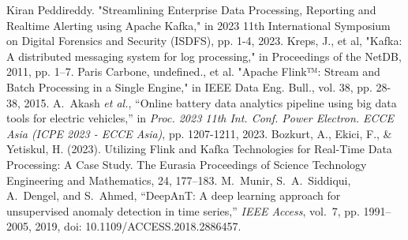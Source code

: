 \documentclass[runningheads]{llncs}
\begin{document}
\begin{thebibliography}{8}
 Kiran Peddireddy. "Streamlining Enterprise Data Processing, Reporting and Realtime Alerting using Apache Kafka," in 2023 11th International Symposium on Digital Forensics and Security (ISDFS), pp. 1-4, 2023.
 Kreps, J., et al, "Kafka: A distributed messaging system for log processing," in Proceedings of the NetDB, 2011, pp. 1–7.
 Paris Carbone, undefined., et al. "Apache Flink™: Stream and Batch Processing in a Single Engine," in IEEE Data Eng. Bull., vol. 38, pp. 28-38, 2015.
 A.~Akash \emph{et al.}, ``Online battery data analytics pipeline using big data tools for electric vehicles,'' in \emph{Proc. 2023 11th Int. Conf. Power Electron. ECCE Asia (ICPE 2023 - ECCE Asia)}, pp. 1207-1211, 2023.
 Bozkurt, A., Ekici, F., \& Yetiskul, H. (2023). Utilizing Flink and Kafka Technologies for Real-Time Data Processing: A Case Study. The Eurasia Proceedings of Science Technology Engineering and Mathematics, 24, 177–183.
 M.~Munir, S.~A.~Siddiqui, A.~Dengel, and S.~Ahmed, ``DeepAnT: A deep learning approach for unsupervised anomaly detection in time series,'' \emph{IEEE Access}, vol.~7, pp. 1991--2005, 2019, doi: 10.1109/ACCESS.2018.2886457.

\end{thebibliography}
\end{document}
